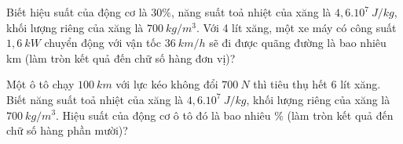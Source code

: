 	
	\begin{vidu} 
		Biết hiệu suất của động cơ là $30 \%$, năng suất toả nhiệt của xăng là $4,6 . 10^{7} \ J / kg$, khối lượng riêng của xăng là $700 \ kg / m^3$. Với 4 lít xăng, một xe máy có công suất $1,6 \ kW$ chuyển động với vận tốc $36 \ km / h$ sẽ đi được quãng đường là bao nhiêu km (làm tròn kết quả  đến chữ số hàng đơn vị)?
	\end{vidu}
	
	\begin{vidu} 
		Một ô tô chạy $100 \ km$ với lực kéo không đổi $700 \ N$ thì tiêu thụ hết 6 lít xăng. Biết năng suất toả nhiệt của xăng là $4,6 . 10^{7} \ J / kg$, khối lượng riêng của xăng là $700 \ kg / m^3$. Hiệu suất của động cơ ô tô đó là bao nhiêu \% (làm tròn kết quả  đến chữ số hàng phần mười)?
	\end{vidu}

